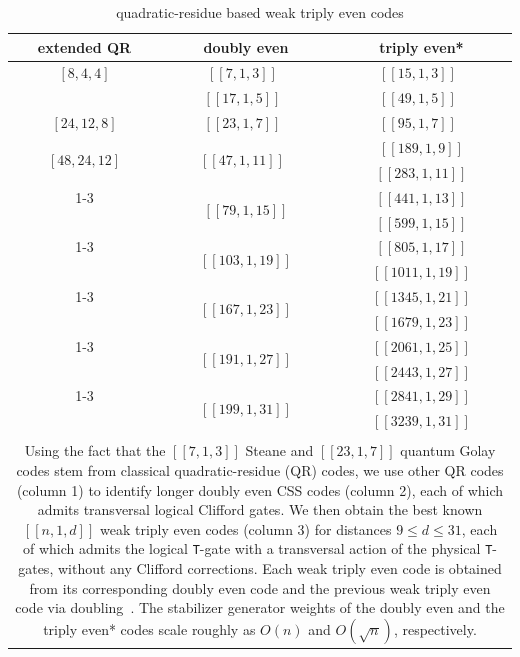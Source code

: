 \documentclass[journal]{IEEEtran}
\newcommand{\T}{\texttt{T}}
\begin{document}
\begin{table}[t]
\caption{quadratic-residue based weak triply even codes}
\label{tab:triply_even_from_QR}
\centering
\begin{tabular}{ccc}
\toprule 
extended QR  & doubly even  & triply even*\tabularnewline
\midrule 
$[8,4,4]$ & $[[7,1,3]]$~\cite{steane_multiple_1996}  & $[[15,1,3]]$~\cite{bravyi_doubled_2015} \tabularnewline
\midrule 
  & $[[17,1,5]]$~\cite{bombin_topological_2006}  & $[[49,1,5]]$~\cite{bravyi_doubled_2015}\tabularnewline
\midrule 
$[24,12,8]$ & $[[23,1,7]]$~\cite{steane_simple_1996}  & $[[95,1,7]]$~\cite{sullivan_code_2024}\tabularnewline
\midrule 
\multirow{2}{*}{$[48,24,12]$} & \multirow{2}{*}{$[[47,1,11]]$~\cite{cross_comparative_2009}} & $[[189,1,9]]$\tabularnewline
 &  & $[[283,1,11]]$\tabularnewline
\cmidrule{1-3}
\multirow{2}{*}{$[80,40,16]$} & \multirow{2}{*}{$[[79,1,15]]$} & $[[441,1,13]]$\tabularnewline
 &  & $[[599,1,15]]$\tabularnewline
\cmidrule{1-3}
\multirow{2}{*}{$[104,52,20]$}& \multirow{2}{*}{$[[103,1,19]]$} & $[[805,1,17]]$\tabularnewline
 &  & $[[1011,1,19]]$\tabularnewline
\cmidrule{1-3}
\multirow{2}{*}{$[168,84,24]$} & \multirow{2}{*}{$[[167,1,23]]$} & $[[1345,1,21]]$\tabularnewline
 &  & $[[1679,1,23]]$\tabularnewline
\cmidrule{1-3}
\multirow{2}{*}{$[192,96,28]$} & \multirow{2}{*}{$[[191,1,27]]$} & $[[2061,1,25]]$\tabularnewline
 &  & $[[2443,1,27]]$\tabularnewline
\cmidrule{1-3}
\multirow{2}{*}{$[200,100,32]$} & \multirow{2}{*}{$[[199,1,31]]$} & $[[2841,1,29]]$\tabularnewline
 &  & $[[3239,1,31]]$\tabularnewline
\bottomrule
\\
\multicolumn{3}{p{251pt}}{Using the fact that the $[[7,1,3]]$ Steane and $[[23,1,7]]$ quantum Golay codes stem from classical quadratic-residue (QR) codes, we use other QR codes (column 1) to identify longer doubly even CSS codes (column 2), each of which admits transversal logical Clifford gates.
We then obtain the best known $[[n,1,d]]$ weak triply even codes (column 3) for distances \(9\leq d\leq 31\), each of which admits the logical \T-gate with a  transversal action of the physical \texttt{T}-gates, without any Clifford corrections. 
Each weak triply even code is obtained from its corresponding doubly even code and the previous weak triply even code via doubling~\cite{betsumiya_triply_2012,bravyi_doubled_2015,haah_towers_2018}. The stabilizer generator weights of the doubly even and the triply even* codes scale roughly as $O(n)$ and $O(\sqrt{n})$, respectively.} 
\end{tabular}

\end{table}
\end{document}
